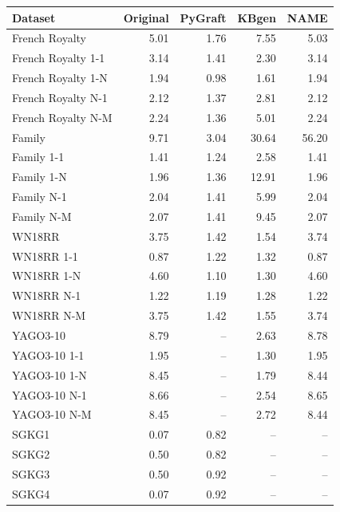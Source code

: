 \begin{tabular}{lrrrr}
\toprule
Dataset & Original & PyGraft & KBgen & NAME \\
\midrule
French Royalty & 5.01 & 1.76 & 7.55 & 5.03 \\
French Royalty 1-1 & 3.14 & 1.41 & 2.30 & 3.14 \\
French Royalty 1-N & 1.94 & 0.98 & 1.61 & 1.94 \\
French Royalty N-1 & 2.12 & 1.37 & 2.81 & 2.12 \\
French Royalty N-M & 2.24 & 1.36 & 5.01 & 2.24 \\
\midrule
Family & 9.71 & 3.04 & 30.64 & 56.20 \\
Family 1-1 & 1.41 & 1.24 & 2.58 & 1.41 \\
Family 1-N & 1.96 & 1.36 & 12.91 & 1.96 \\
Family N-1 & 2.04 & 1.41 & 5.99 & 2.04 \\
Family N-M & 2.07 & 1.41 & 9.45 & 2.07 \\
\midrule
WN18RR & 3.75 & 1.42 & 1.54 & 3.74 \\
WN18RR 1-1 & 0.87 & 1.22 & 1.32 & 0.87 \\
WN18RR 1-N & 4.60 & 1.10 & 1.30 & 4.60 \\
WN18RR N-1 & 1.22 & 1.19 & 1.28 & 1.22 \\
WN18RR N-M & 3.75 & 1.42 & 1.55 & 3.74 \\
\midrule
YAGO3-10 & 8.79 & – & 2.63 & 8.78 \\
YAGO3-10 1-1 & 1.95 & – & 1.30 & 1.95 \\
YAGO3-10 1-N & 8.45 & – & 1.79 & 8.44 \\
YAGO3-10 N-1 & 8.66 & – & 2.54 & 8.65 \\
YAGO3-10 N-M & 8.45 & – & 2.72 & 8.44 \\
\midrule
SGKG1 & 0.07 & 0.82 & – & – \\
SGKG2 & 0.50 & 0.82 & – & – \\
SGKG3 & 0.50 & 0.92 & – & – \\
SGKG4 & 0.07 & 0.92 & – & – \\
\bottomrule
\end{tabular}
